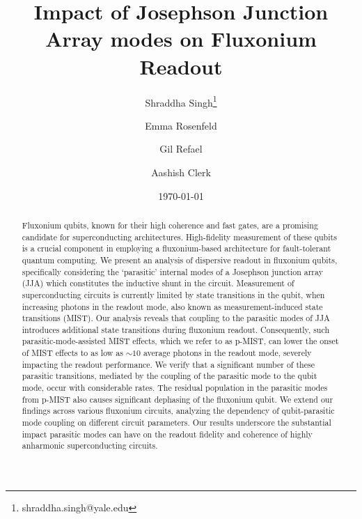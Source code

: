 \documentclass[prx,showpacs,notitlepage,twocolumn,superscriptaddress,nofootinbib,preprintnumbers,floatfix]{revtex4-2}
\begin{document}
\title{Impact of Josephson Junction Array modes on Fluxonium Readout}

\author{Shraddha Singh\thanks{shraddha.singh@yale.edu}}
\author{Emma Rosenfeld}
\author{Gil Refael}
\author{Aashish Clerk}
\date{\today}%
\begin{abstract}
Fluxonium qubits, known for their high coherence and fast gates, are a promising candidate for superconducting architectures. High-fidelity measurement of these qubits is a crucial component in employing a fluxonium-based architecture for fault-tolerant quantum computing. We present an analysis of dispersive readout in fluxonium qubits, specifically considering the `parasitic' internal modes of a Josephson junction array (JJA) which constitutes the inductive shunt in the circuit. %
Measurement of superconducting circuits is currently limited by state transitions in the qubit, when increasing photons in the readout mode, also known as measurement-induced state transitions (MIST). 
Our analysis reveals that coupling to the parasitic modes of JJA introduces additional state transitions during fluxonium readout. Consequently, such parasitic-mode-assisted MIST effects, which we refer to as p-MIST, can lower the onset of MIST effects to as low as $\sim 10$ average photons in the readout mode, severely impacting the readout performance. %
We verify that a significant number of these parasitic transitions, mediated by the coupling of the parasitic mode to the qubit mode, occur with considerable rates. %
The residual population in the parasitic modes from p-MIST also causes significant dephasing of the fluxonium qubit. We extend our findings across various fluxonium circuits, analyzing the dependency of qubit-parasitic mode coupling on different circuit parameters. Our results underscore the substantial impact parasitic modes can have on the readout fidelity and coherence of highly anharmonic superconducting circuits.
\end{abstract}
\maketitle
\end{document}
